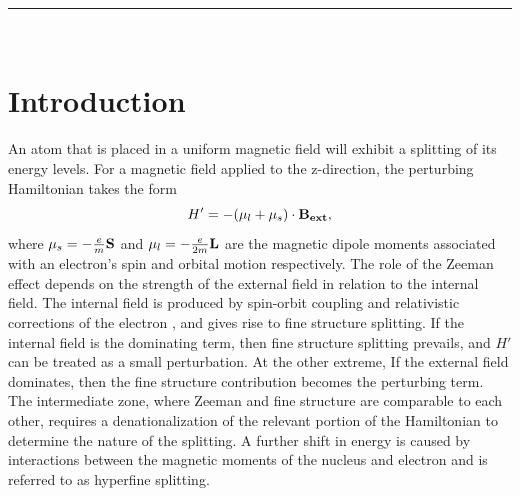 \documentclass[12pt]{article}
\makeatletter
\newcommand{\partition}{\rule{\linewidth}{0.8pt}}
\renewcommand{\maketitle}{
\begin{center}
\@date \hfill  \@author\\
{\Large \textsc{\@title}}
\partition\\
\end{center}
}
\makeatother
\begin{document}
\maketitle
\linespread{1.5}


\section{Introduction}

An atom that is placed in a uniform magnetic field will exhibit a splitting of its energy levels. For a magnetic field applied to the z-direction, the perturbing Hamiltonian takes the form
\begin{equation}
H' = -(\mu_l + \mu_s) \cdot \bf{B}_{ext}, 
\end{equation}\label{eq:H}
where $\mu_s = -\frac{e}{m}\bf{S}$ and $\mu_l = -\frac{e}{2m}\bf{L}$ are the magnetic dipole moments associated with an electron's spin and orbital motion respectively. The role of the Zeeman effect depends on the strength of the external field in relation to the internal field. The internal field is produced by spin-orbit coupling and relativistic corrections of the electron \cite{Sakurai}, and gives rise to fine structure splitting. If the internal field is the dominating term, then fine structure splitting prevails, and $H'$ can be treated as a small perturbation. At the other extreme, If the external field dominates, then the fine structure contribution becomes the perturbing term. The intermediate zone, where Zeeman and fine structure are comparable to each other, requires a denationalization of the relevant portion of the Hamiltonian to determine the nature of the splitting. A further shift in energy is caused by interactions between the magnetic moments of the nucleus and electron and is referred to as hyperfine splitting. 
\end{document}
